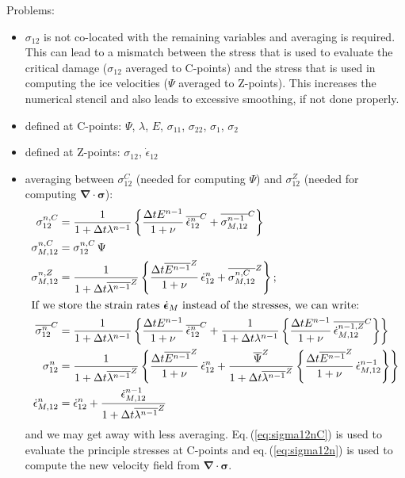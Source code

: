 \documentclass[12pt]{article}
\newcommand{\sr}{\dot{\epsilon}}
\newcommand{\srb}{\dot{\bm{\epsilon}}}
\begin{document}
Problems:
\begin{itemize}
\item $\sigma_{12}$ is not co-located with the remaining variables and averaging is required. This can lead to a mismatch between the stress that is used to evaluate the critical damage ($\sigma_{12}$ averaged to C-points) and the stress that is used in computing the ice velocities ($\Psi$ averaged to Z-points). This increases the numerical stencil and also leads to excessive smoothing, if not done properly.
\item defined at C-points: $\Psi$, $\lambda$, $E$, $\sigma_{11}$, $\sigma_{22}$, $\sigma_{1}$, $\sigma_{2}$
\item defined at Z-points: $\sigma_{12}$, $\sr_{12}$
\item averaging between $\sigma_{12}^C$ (needed for computing $\Psi$) and $\sigma_{12}^Z$ (needed for computing $\bm{\nabla\cdot\sigma}$):
  \begin{align}
    \sigma_{12}^{n,C} &= \frac{1}{1+\Delta{t}\lambda^{n-1}}
                      \left\{\frac{\Delta{t}E^{n-1}}{1+\nu}
                      \,\overline{\sr_{12}^{n}}^{C}
                      +\overline{\sigma_{M,12}^{n-1}}^{C}\right\} \\
    \sigma_{M,12}^{n,C} &= \sigma_{12}^{n,C}\,\Psi \\
    \sigma_{M,12}^{n,Z} &= \frac{1}{1+\Delta{t}\overline{\lambda^{n-1}}^{Z}}
                          \left\{\frac{\Delta{t}\overline{E^{n-1}}^{Z}}{1+\nu}\,
                          \sr_{12}^{n}
                        + \overline{\sigma_{M,12}^{n,C}}^Z\right\}; \\
    \intertext{If we store the strain rates $\srb_M$ instead of the stresses, we can write:}
    \label{eq:sigma12nC}
    \overline{\sigma_{12}^{n}}^C &= \frac{1}{1+\Delta{t}\lambda^{n-1}}
                      \left\{\frac{\Delta{t}E^{n-1}}{1+\nu}
                      \,\overline{\sr_{12}^{n}}^{C}
                      +\frac{1}{1+\Delta{t}\lambda^{n-1}}\left\{
                      \frac{\Delta{t}E^{n-1}}{1+\nu}
                      \,\overline{\sr_{M,12}^{n-1,Z}}^{C}\right\}\right\} \\
    \label{eq:sigma12n}
    \sigma_{12}^{n} &= \frac{1}{1+\Delta{t}\overline{\lambda^{n-1}}^{Z}}
                      \left\{\frac{\Delta{t}\overline{E^{n-1}}^{Z}}{1+\nu}
                      \,\sr_{12}^{n}
                      +\frac{\overline{\Psi}^Z}
                      {1+\Delta{t}\overline{\lambda^{n-1}}^{Z}}
                      \left\{
                      \frac{\Delta{t}\overline{E^{n-1}}^{Z}}{1+\nu}
                      \,\sr_{M,12}^{n-1}
                      \right\}
                      \right\}\\
    \sr_{M,12}^{n} &= \sr_{12}^{n}
                   +\frac{\sr_{M,12}^{n-1}}{1+\Delta{t}\overline{\lambda^{n-1}}^Z}
  \end{align}
  and we may get away with less averaging. Eq.\,(\ref{eq:sigma12nC}) is used to evaluate the principle stresses at C-points and eq.\,(\ref{eq:sigma12n}) is used to compute the new velocity field from $\bm{\nabla\cdot\sigma}$.
\end{itemize}
\end{document}
